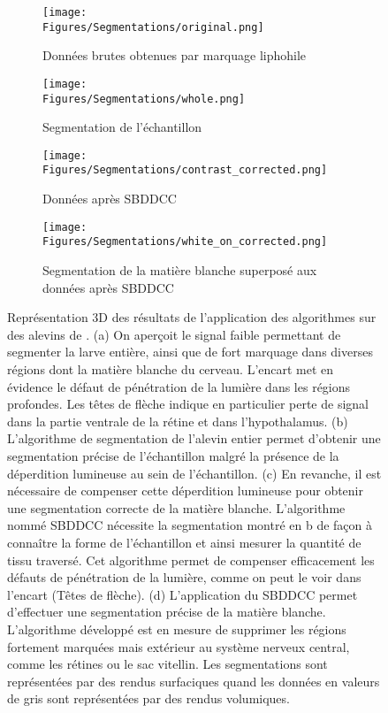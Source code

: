 \documentclass[\main/main.tex]{subfiles}
\begin{document}
\begin{figure}[h!]
    \centering
    \begin{subfigure}[b]{0.45\textwidth}
       \caption{
            \label{fig:lempereur_info:brut}
            Données brutes obtenues par marquage liphohile
            }
       \centering \texttt{[image: \\Figures/Segmentations/original.png]}
    \end{subfigure}
    \begin{subfigure}[b]{0.45\textwidth}
       \caption{
        \label{fig:lempereur_info:whole}
        Segmentation de l'échantillon
        }
       \centering \texttt{[image: \\Figures/Segmentations/whole.png]}
    \end{subfigure}
    \begin{subfigure}[b]{0.45\textwidth}
       \caption{
           \label{fig:lempereur_info:correction}
           Données après SBDDCC
        }
       \centering \texttt{[image: \\Figures/Segmentations/contrast\_corrected.png]}
    \end{subfigure}
    \begin{subfigure}[b]{0.45\textwidth}
       \caption{
           \label{fig:lempereur_info:white}
            Segmentation de la matière blanche superposé aux données après SBDDCC
            }
       \centering \texttt{[image: \\Figures/Segmentations/white\_on\_corrected.png]}
    \end{subfigure}
    \caption{
        \label{fig:lempereur_info}
        Représentation 3D des résultats de l'application des algorithmes sur des alevins de \pz{}.
        \newline
        (a) On aperçoit le signal faible permettant de segmenter la larve entière, ainsi que de fort marquage dans diverses régions dont la matière blanche du cerveau. L'encart met en évidence le défaut de pénétration de la lumière dans les régions profondes. Les têtes de flèche indique en particulier  perte de signal dans la partie ventrale de la rétine et dans l'hypothalamus.
        (b) L'algorithme de segmentation de l'alevin entier permet d'obtenir une segmentation précise de l'échantillon malgré la présence de la déperdition lumineuse au sein de l'échantillon.
        (c)
        En revanche, il est nécessaire de compenser cette déperdition lumineuse pour obtenir une segmentation correcte de la matière blanche. L'algorithme nommé SBDDCC nécessite la segmentation  montré en b de façon à connaître la forme de l'échantillon et ainsi mesurer la quantité de tissu traversé.
        Cet algorithme permet de compenser efficacement les défauts de pénétration de la lumière, comme on peut le voir dans l'encart (Têtes de flèche).
        (d) L'application du SBDDCC permet d'effectuer une segmentation précise de la matière blanche. L'algorithme développé est en mesure de supprimer les régions fortement marquées mais extérieur au système nerveux central, comme les rétines ou le sac vitellin.
        \newline
        Les segmentations sont représentées par des rendus surfaciques quand les données en valeurs de gris sont représentées par des rendus volumiques.
    }
    
\end{figure}
\end{document}
